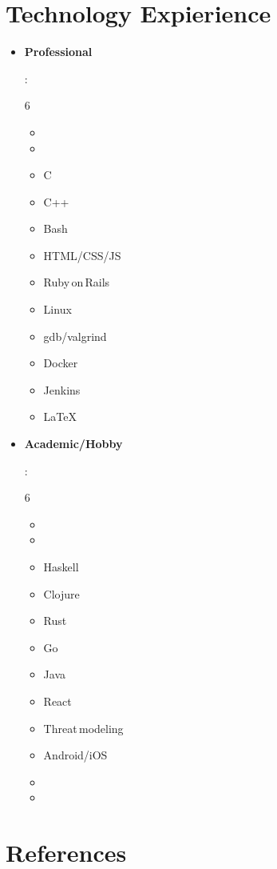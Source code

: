 \documentclass[letterpaper,11pt]{article}
\newcommand{\resumeItem}[2]{
  \item\small{
    \textbf{#1}{: #2 \vspace{-2pt}}
  }
}
\newcommand{\resumeReference}[4]{
  \vspace{-1pt}\item
    \textbf{#1} - \textit{\small#2} \dotfill #3 - #4
  \vspace{-5pt}
}
\newcommand{\resumeSubItem}[2]{\resumeItem{#1}{#2}\vspace{-4pt}}
\newcommand{\resumeSubHeadingListStart}{\begin{itemize}[leftmargin=*]}
\newcommand{\resumeSubHeadingListEnd}{\end{itemize}}
\newcommand{\resumeListMulticolStart}[1]{
  \vspace{-2.4em}
  \setlength{\columnsep}{-1pc}
  \begin{multicols}{#1}
    \begin{itemize}[label={}]
      \item
}
\newcommand{\resumeListMulticolEnd}{
    \end{itemize}
  \end{multicols}
  \vspace{-10pt}
}
\begin{document}
\section{Technology Expierience}
  \resumeSubHeadingListStart

  \resumeSubItem{Professional}
    {
      \resumeListMulticolStart{6}
        \item %
        \item C
        \item C++
        \item Bash
        \item HTML/CSS/JS
        \item Ruby\,on\,Rails
        \item Linux
        \item gdb/valgrind
        \item Docker
        \item Jenkins
        \item \LaTeX
      \resumeListMulticolEnd
    }
  \resumeSubItem{Academic/Hobby}
    {
      \resumeListMulticolStart{6}
        \item %
        \item Haskell
        \item Clojure
        \item Rust
        \item Go
        \item Java
        \item React
        \item Threat\,modeling
        \item Android/iOS
        \item %
        \item %
      \resumeListMulticolEnd
    }
  \resumeSubHeadingListEnd


\section{References}
\resumeSubHeadingListStart
  
\resumeSubHeadingListEnd


\end{document}
